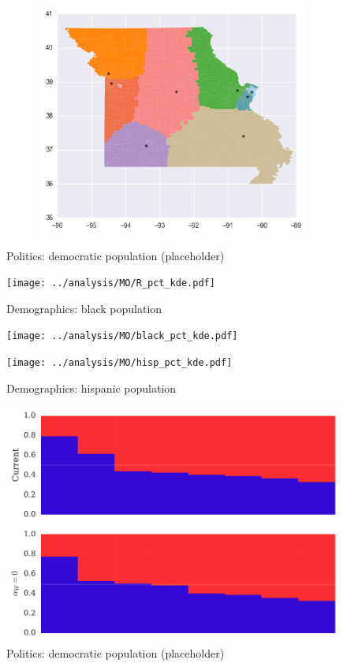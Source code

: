 \begin{figure}[htb!]
\includegraphics[width=5in,height=3in,keepaspectratio]{../maps/MO/static/0_25_after.png}
\end{figure}

\clearpage
\newpage

\begin{figure}[htb!] \centering
\caption{ Politics: democratic population (placeholder)}
\texttt{[image: ../analysis/MO/R\_pct\_kde.pdf]}
\caption{ Demographics: black population }
\texttt{[image: ../analysis/MO/black\_pct\_kde.pdf]}
\caption{ Demographics: hispanic population }
\texttt{[image: ../analysis/MO/hisp\_pct\_kde.pdf]}
\end{figure}

\clearpage
\newpage

\begin{figure}[htb!] \centering
\caption{ Politics: democratic population (placeholder)}
\includegraphics[width=6in]{../analysis/MO/barplot.pdf}
\end{figure}

